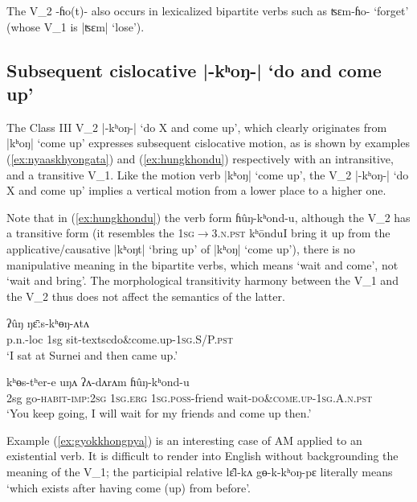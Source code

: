 \documentclass[oneside,a4paper,11pt]{article}
\newcommand{\ipa}[1]{{\phon#1}}
\newcommand{\dhatu}[2]{|\ipa{#1}| `#2'}
\begin{document}
The V_2 \ipa{-ɦo(t)-} also occurs in lexicalized bipartite verbs such as \ipa{ʦɛm-ɦo-} `forget' (whose V_1 is \dhatu{ʦɛm}{lose}).

\subsection{Subsequent cislocative \dhatu{-kʰoŋ-}{do and come up}} \label{sec:v2.khoN}
The Class III V_2 \dhatu{-kʰoŋ-}{do X and come up}, which clearly originates from \dhatu{kʰoŋ}{come up} expresses subsequent cislocative motion, as is shown by examples (\ref{ex:nyaaskhyongata}) and (\ref{ex:hungkhondu}) respectively with an intransitive, and a transitive V_1. Like the motion verb  \dhatu{kʰoŋ}{come up}, the V_2  \dhatu{-kʰoŋ-}{do X and come up} implies a vertical motion from a lower place to a higher one.

Note that in (\ref{ex:hungkhondu}) the verb form \ipa{ɦûŋ-kʰond-u}, although the V_2 has a transitive form (it resembles the \textsc{1sg$\rightarrow$3.n.pst} \ipa{kʰōndu}{I bring it up} from the applicative/causative \dhatu{kʰoŋt}{bring up} of \dhatu{kʰoŋ}{come up}), there is no manipulative meaning in the bipartite verbs, which means `wait and come', not `wait and bring'. The morphological transitivity harmony between the V_1 and the V_2 thus does not affect the semantics of the latter.

\begin{exe}
\ex \label{ex:nyaaskhyongata}
 \gll  \ipa{sʉ̂rnɛj-bi} \ipa{ʔûŋ} \ipa{ŋɛ̄ːs-kʰɵŋ-ʌtʌ} \\
 p.n.-loc 1sg sit-textsc{do\&come.up}-\textsc{1sg.S/P.pst} \\
\glt  `I sat at Surnei and then came up.'
\end{exe}

\begin{exe}  
\ex \label{ex:hungkhondu}
 \gll  \ipa{ʔīn} \ipa{kʰɵs-tʰer-e} \ipa{uŋʌ} \ipa{ʔʌ-dʌrʌm} \ipa{ɦûŋ-kʰond-u} \\
 2sg go-\textsc{habit}-\textsc{imp}:\textsc{2sg} \textsc{1sg}.\textsc{erg} \textsc{1sg}.\textsc{poss}-friend wait-\textsc{do\&come.up}-\textsc{1sg.A.n.pst} \\
\glt `You keep going, I will wait for my friends and come up then.'
\end{exe}

Example (\ref{ex:gyokkhongpya}) is an interesting case of AM applied to an existential verb. It is difficult to render into English without backgrounding the meaning of the V_1; the participial relative \ipa{lɛ̂l-kʌ} \ipa{gɵ-k-kʰoŋ-pɛ} literally means `which exists after having come (up) from before'.
\end{document}
